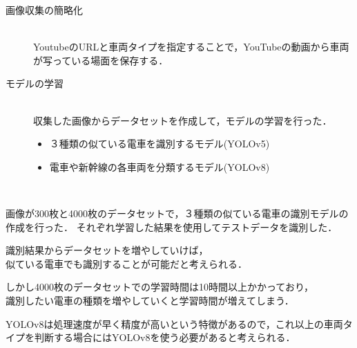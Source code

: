 


\begin{description}
	\item[画像収集の簡略化] ~\\
	YoutubeのURLと車両タイプを指定することで，YouTubeの動画から車両が写っている場面を保存する．
	\href{run:./fig/demo.mp4}{\textcolor[hsb]{0.0, 0.7, 1.0}{\faPlayCircle[regular]}}
	
	\item[モデルの学習]~\\
	収集した画像からデータセットを作成して，モデルの学習を行った．
	\begin{itemize}
		\item ３種類の似ている電車を識別するモデル(YOLOv5)
		\item 電車や新幹線の各車両を分類するモデル(YOLOv8)
	\end{itemize}
\end{description}
\newpage



\begin{description}
	\item [似ている電車の識別] ~\\
	\item 画像が300枚と4000枚のデータセットで，３種類の似ている電車の識別モデルの作成を行った．
	それぞれ学習した結果を使用してテストデータを識別した．
	\href{run:./fig/hikaku/hikaku_demo.mp4}{\textcolor[hsb]{0.0, 0.7, 1.0}{\faPlayCircle[regular]}}\\
	\newpage
	
	\item 識別結果からデータセットを増やしていけば，\\似ている電車でも識別することが可能だと考えられる．
	\item しかし4000枚のデータセットでの学習時間は10時間以上かかっており，\\識別したい電車の種類を増やしていくと学習時間が増えてしまう．
	\item YOLOv8は処理速度が早く精度が高いという特徴があるので，これ以上の車両タイプを判断する場合にはYOLOv8を使う必要があると考えられる．
\end{description}


